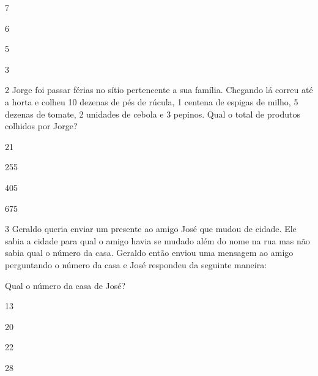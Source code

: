 {\begin{escolha}
\item
  7
\item
  6
\item
  5
\item
  3
\end{escolha}


\num{2} Jorge foi passar férias no sítio pertencente a sua família.
Chegando lá correu até a horta e colheu 10 dezenas de pés de rúcula, 1
centena de espigas de milho, 5 dezenas de tomate, 2 unidades de cebola e
3 pepinos. Qual o total de produtos colhidos por Jorge?

\begin{escolha}
\item
  21
\item
  255
\item
  405
\item
  675
\end{escolha}


\num{3} Geraldo queria enviar um presente ao amigo José que mudou de
cidade. Ele sabia a cidade para qual o amigo havia se mudado além do
nome na rua mas não sabia qual o número da casa. Geraldo então enviou
uma mensagem ao amigo perguntando o número da casa e José respondeu da
seguinte maneira:


Qual o número da casa de José?

\begin{escolha}
\item
  13
\item
  20
\item
  22
\item
  28
\end{escolha}

}
